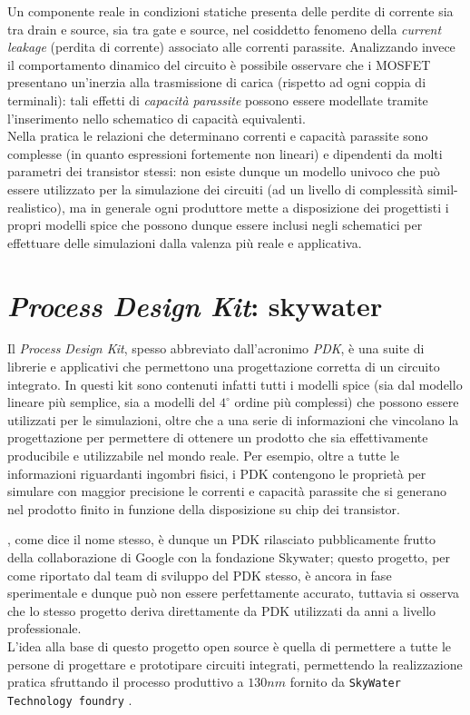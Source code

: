 	Un componente reale in condizioni statiche presenta delle perdite di corrente sia tra drain e source, sia tra gate e source, nel cosiddetto fenomeno della \textit{current leakage} (perdita di corrente) associato alle correnti parassite. Analizzando invece il comportamento dinamico del circuito è possibile osservare che i MOSFET presentano un'inerzia alla trasmissione di carica (rispetto ad ogni coppia di terminali): tali effetti di \textit{capacità parassite} possono essere modellate tramite l'inserimento nello schematico di capacità equivalenti. \\
	Nella pratica le relazioni che determinano correnti e capacità parassite sono complesse (in quanto espressioni fortemente non lineari) e dipendenti da molti parametri dei transistor stessi: non esiste dunque un modello univoco che può essere utilizzato per la simulazione dei circuiti (ad un livello di complessità simil-realistico), ma in generale ogni produttore mette a disposizione dei progettisti i propri modelli spice che possono dunque essere inclusi negli schematici per effettuare delle simulazioni dalla valenza più reale e applicativa.
	
\section{\textit{Process Design Kit}: skywater}
	
	Il \textit{Process Design Kit}, spesso abbreviato dall'acronimo \textit{PDK}, è una suite di librerie e applicativi che permettono una progettazione corretta di un circuito integrato. In questi kit sono contenuti infatti tutti i modelli spice (sia dal modello lineare più semplice, sia a modelli del $4^\circ$ ordine più complessi) che possono essere utilizzati per le simulazioni, oltre che a una serie di informazioni che vincolano la progettazione per permettere di ottenere un prodotto che sia effettivamente producibile e utilizzabile nel mondo reale. Per esempio, oltre a tutte le informazioni riguardanti ingombri fisici, i PDK contengono le proprietà per simulare con maggior precisione le correnti e capacità parassite che si generano nel prodotto finito in funzione della disposizione su chip dei transistor.
	
	\skywater, come dice il nome stesso, è dunque un PDK rilasciato pubblicamente frutto della collaborazione di Google con la fondazione Skywater; questo progetto, per come riportato dal team di sviluppo del PDK stesso, è ancora in fase sperimentale e dunque può non essere perfettamente accurato, tuttavia si osserva che lo stesso progetto deriva direttamente da PDK utilizzati da anni a livello professionale. \\
	L'idea alla base di questo progetto open source è quella di permettere a tutte le persone di progettare e prototipare circuiti integrati, permettendo la realizzazione pratica sfruttando il processo produttivo a $130 nm$ fornito da \texttt{SkyWater Technology foundry} \cite{fossi}.
	
